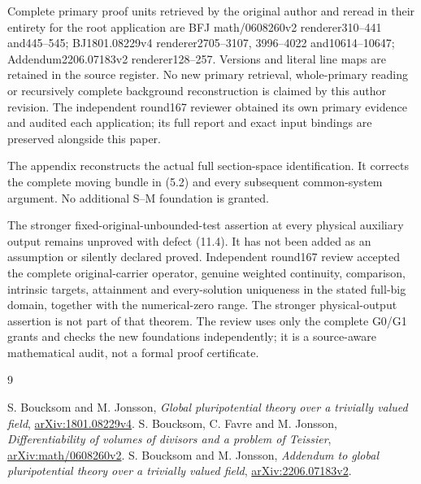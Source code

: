 \documentclass[10pt]{article}
\begin{document}
Complete primary proof units retrieved by the original author and reread
in their entirety for the root application are BFJ math/0608260v2
renderer310--441 and445--545; BJ1801.08229v4 renderer2705--3107,
3996--4022 and10614--10647; Addendum2206.07183v2 renderer128--257.
Versions and literal line maps are retained in the source register.
No new primary retrieval, whole-primary reading or recursively complete
background reconstruction is claimed by this author revision. The independent
round167 reviewer obtained its own primary evidence and audited each application;
its full report and exact input bindings are preserved alongside this paper.

The appendix reconstructs the actual full section-space identification.
It corrects the complete moving bundle in (5.2) and every subsequent
common-system argument. No additional S--M foundation is granted.

The stronger fixed-original-unbounded-test assertion at every physical
auxiliary output remains unproved with defect (11.4). It has not been
added as an assumption or silently declared proved. Independent round167
review accepted the complete original-carrier operator, genuine weighted
continuity, comparison, intrinsic targets, attainment and every-solution
uniqueness in the stated full-big domain, together with the numerical-zero
range. The stronger physical-output assertion is not part of that theorem.
The review uses only the complete G0/G1 grants and checks the new
foundations independently; it is a source-aware mathematical audit,
not a formal proof certificate.

\begin{thebibliography}{9}
\raggedright
{} S. Boucksom and M. Jonsson, \emph{Global pluripotential theory
over a trivially valued field}, \href{https://arxiv.org/pdf/1801.08229v4}{arXiv:1801.08229v4}.
 S. Boucksom, C. Favre and M. Jonsson, \emph{Differentiability
of volumes of divisors and a problem of Teissier},
\href{https://arxiv.org/html/math/0608260v2}{arXiv:math/0608260v2}.
 S. Boucksom and M. Jonsson, \emph{Addendum to global
pluripotential theory over a trivially valued field},
\href{https://arxiv.org/pdf/2206.07183v2}{arXiv:2206.07183v2}.
\end{thebibliography}
\end{document}
